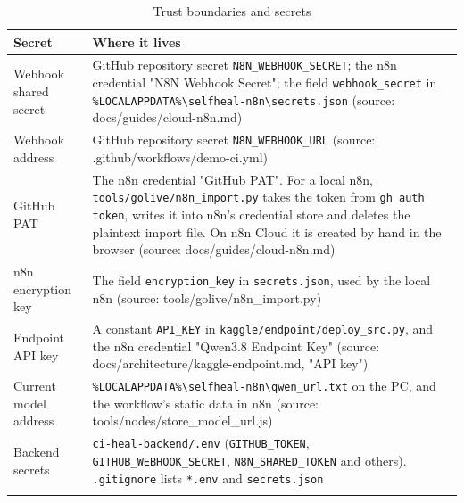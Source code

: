 \begingroup\small
\begin{longtable}{>{\raggedright\arraybackslash}p{0.218\dimexpr\linewidth-4\tabcolsep\relax}>{\raggedright\arraybackslash}p{0.782\dimexpr\linewidth-4\tabcolsep\relax}}
\toprule
\rowcolor{gray!14}\textbf{Secret} & \textbf{Where it lives} \\
\midrule
\endhead
\bottomrule
\endfoot
\endlastfoot
Webhook shared secret & GitHub repository secret \texttt{N8N\_\allowbreak{}WEBHOOK\_\allowbreak{}SECRET}; the n8n credential "N8N Webhook Secret"; the field \texttt{webhook\_\allowbreak{}secret} in \texttt{\%LOCALAPPDATA\%\textbackslash{}selfheal-\allowbreak{}n8n\textbackslash{}secrets.\allowbreak{}json} (source: docs/\allowbreak{}guides/\allowbreak{}cloud-n8n.md) \\
Webhook address & GitHub repository secret \texttt{N8N\_\allowbreak{}WEBHOOK\_\allowbreak{}URL} (source: .github/\allowbreak{}workflows/\allowbreak{}demo-ci.yml) \\
GitHub PAT & The n8n credential "GitHub PAT". For a local n8n, \texttt{tools/\allowbreak{}golive/\allowbreak{}n8n\_\allowbreak{}import.\allowbreak{}py} takes the token from \texttt{gh auth token}, writes it into n8n's credential store and deletes the plaintext import file. On n8n Cloud it is created by hand in the browser (source: docs/\allowbreak{}guides/\allowbreak{}cloud-n8n.md) \\
n8n encryption key & The field \texttt{encryption\_\allowbreak{}key} in \texttt{secrets.\allowbreak{}json}, used by the local n8n (source: tools/\allowbreak{}golive/\allowbreak{}n8n\_\allowbreak{}import.py) \\
Endpoint API key & A constant \texttt{API\_\allowbreak{}KEY} in \texttt{kaggle/\allowbreak{}endpoint/\allowbreak{}deploy\_\allowbreak{}src.\allowbreak{}py}, and the n8n credential "Qwen3.8 Endpoint Key" (source: docs/\allowbreak{}architecture/\allowbreak{}kaggle-endpoint.md, "API key") \\
Current model address & \texttt{\%LOCALAPPDATA\%\textbackslash{}selfheal-\allowbreak{}n8n\textbackslash{}qwen\_\allowbreak{}url.\allowbreak{}txt} on the PC, and the workflow's static data in n8n (source: tools/\allowbreak{}nodes/\allowbreak{}store\_\allowbreak{}model\_\allowbreak{}url.js) \\
Backend secrets & \texttt{ci-\allowbreak{}heal-\allowbreak{}backend/\allowbreak{}.\allowbreak{}env} (\texttt{GITHUB\_\allowbreak{}TOKEN}, \texttt{GITHUB\_\allowbreak{}WEBHOOK\_\allowbreak{}SECRET}, \texttt{N8N\_\allowbreak{}SHARED\_\allowbreak{}TOKEN} and others). \texttt{.\allowbreak{}gitignore} lists \texttt{*.\allowbreak{}env} and \texttt{secrets.\allowbreak{}json} \\
\bottomrule
\caption{Trust boundaries and secrets}\label{tab:04-4}\\
\end{longtable}
\endgroup


